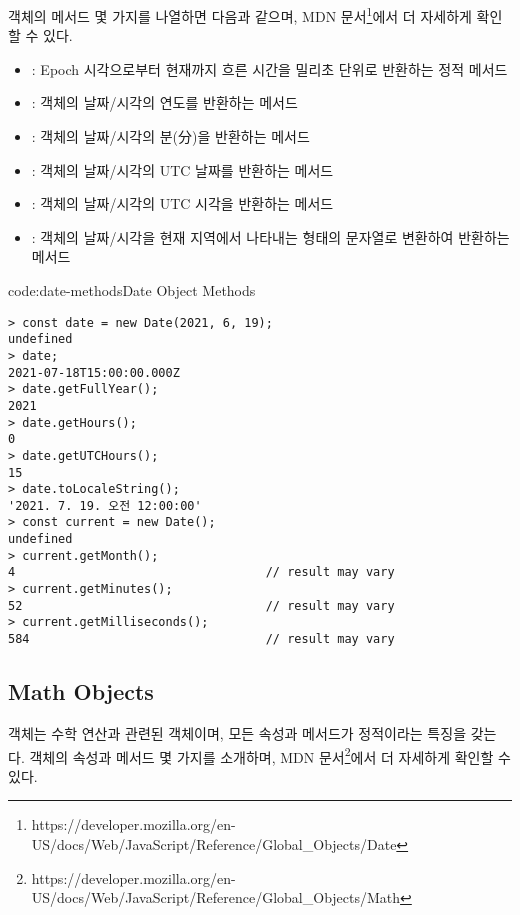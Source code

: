  객체의 메서드 몇 가지를 나열하면 다음과 같으며, MDN 문서\footnote{https://developer.mozilla.org/en-US/docs/Web/JavaScript/Reference/Global\_Objects/Date}에서 더 자세하게 확인할 수 있다.

\begin{itemize}
    \item {}: Epoch 시각으로부터 현재까지 흐른 시간을 밀리초 단위로 반환하는 정적 메서드
    \item {}:  객체의 날짜/시각의 연도를 반환하는 메서드
    \item {}:  객체의 날짜/시각의 분(分)을 반환하는 메서드
    \item {}:  객체의 날짜/시각의 UTC 날짜를 반환하는 메서드
    \item {}:  객체의 날짜/시각의 UTC 시각을 반환하는 메서드
    \item {}:  객체의 날짜/시각을 현재 지역에서 나타내는 형태의 문자열로 변환하여 반환하는 메서드
\end{itemize}

\begin{codeenv}{code:date-methods}{Date Object Methods}\begin{verbatim}
> const date = new Date(2021, 6, 19);
undefined
> date;
2021-07-18T15:00:00.000Z
> date.getFullYear();
2021
> date.getHours();
0
> date.getUTCHours();
15
> date.toLocaleString();
'2021. 7. 19. 오전 12:00:00'
> const current = new Date();
undefined
> current.getMonth();
4                                   // result may vary
> current.getMinutes();
52                                  // result may vary
> current.getMilliseconds();
584                                 // result may vary
\end{verbatim}
\end{codeenv}
\newpage

\subsection*{Math Objects}

 객체는 수학 연산과 관련된 객체이며, 모든 속성과 메서드가 정적이라는 특징을 갖는다.  객체의 속성과 메서드 몇 가지를 소개하며, MDN 문서\footnote{https://developer.mozilla.org/en-US/docs/Web/JavaScript/Reference/Global\_Objects/Math}에서 더 자세하게 확인할 수 있다.

